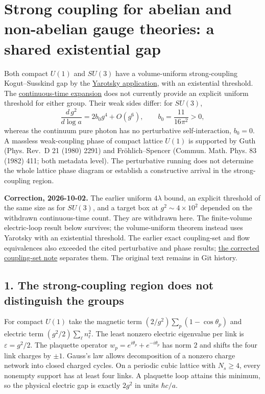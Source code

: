 \documentclass[11pt,a4paper]{article}
\begin{document}
\section{Strong coupling for abelian and non-abelian gauge theories: a
shared existential
gap}\label{strong-coupling-for-abelian-and-non-abelian-gauge-theories-a-shared-existential-gap}

Both compact \(U(1)\) and \(SU(3)\) have a volume-uniform
strong-coupling Kogut--Susskind gap by the
\href{strong-coupling-uniform-gap.md}{Yarotsky application}, with an
existential threshold. The
\href{kogut-susskind-strong-coupling-explicit.md}{continuous-time
expansion} does not currently provide an explicit uniform threshold for
either group. Their weak sides differ: for \(SU(3)\),
\[\frac{d\,g^2}{d\log a}=2b_0g^4+O(g^6),\qquad b_0=\frac{11}{16\pi^2}>0,\]
whereas the continuum pure photon has no perturbative self-interaction,
\(b_0=0\). A massless weak-coupling phase of compact lattice \(U(1)\) is
supported by Guth (Phys. Rev.~D 21 (1980) 2291) and Fröhlich--Spencer
(Commun. Math. Phys. 83 (1982) 411; both metadata level). The
perturbative running does not determine the whole lattice phase diagram
or establish a constructive arrival in the strong-coupling region.

\textbf{Correction, 2026-10-02.} The earlier uniform \(4\lambda\) bound,
an explicit threshold of the same size as for \(SU(3)\), and a target
box at \(g^2\sim4\times10^2\) depended on the withdrawn continuous-time
count. They are withdrawn here. The finite-volume electric-loop result
below survives; the volume-uniform theorem instead uses Yarotsky with an
existential threshold. The earlier exact coupling-set and flow
equivalences also exceeded the cited perturbative and phase results;
\href{gapped-set-critical-coupling.md}{the corrected coupling-set note}
separates them. The original text remains in Git history.

\subsection{1. The strong-coupling region does not distinguish the
groups}\label{the-strong-coupling-region-does-not-distinguish-the-groups}

For compact \(U(1)\) take the magnetic term
\((2/g^2)\sum_p(1-\cos\theta_p)\) and electric term
\((g^2/2)\sum_\ell n_\ell^2\). The least nonzero electric eigenvalue per
link is \(\varepsilon=g^2/2\). The plaquette operator
\(w_p=e^{i\theta_p}+e^{-i\theta_p}\) has norm \(2\) and shifts the four
link charges by \(\pm1\). Gauss's law allows decomposition of a nonzero
charge network into closed charged cycles. On a periodic cubic lattice
with \(N_s\ge4\), every nonempty support has at least four links. A
plaquette loop attains this minimum, so the physical electric gap is
exactly \(2g^2\) in units \(\hbar c/a\).
\end{document}

